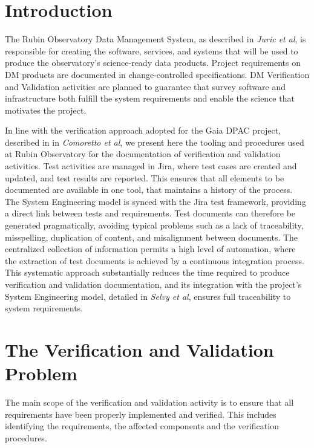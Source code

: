 \section{Introduction}

The Rubin Observatory Data Management System, as described in \textit{Juric et al}\cite{2015arXiv151207914J},
is responsible for creating the software, services, and systems that will be used to
produce the observatory's science-ready data products.  Project requirements on DM
products are documented in change-controlled specifications. DM Verification and Validation activities are planned
to guarantee that survey software and infrastructure both fulfill the system requirements and enable the science that
motivates the project.

In line with the verification approach adopted for the Gaia DPAC project, described in in \textit{Comoretto et al}\cite{10.1117/12.926797},
we present here the tooling and procedures used at Rubin Observatory for the documentation of verification and
validation activities. Test activities are managed in Jira, where test cases are created and updated, and test results
are reported. This ensures that all elements to be documented are available in one tool, that maintains a history of
the process. The System Engineering model is synced with the Jira test framework, providing a direct link between
tests and requirements. Test documents can therefore be generated pragmatically, avoiding typical problems
such as a lack of traceability, misspelling, duplication of content, and misalignment between documents. The
centralized collection of information permits a high level of automation, where the extraction of test documents is
achieved by a continuous integration process. This systematic approach substantially reduces the time required to
produce verification and validation documentation, and its integration with the project's System Engineering model,
detailed in \textit{Selvy et al}\cite{10.1117/12.2310125}, ensures full traceability to system requirements.


\section{The Verification and Validation Problem}

The main scope of the verification and validation activity is to ensure that all requirements have been properly implemented and verified.
This includes identifying the requirements, the affected components and the verification procedures.

